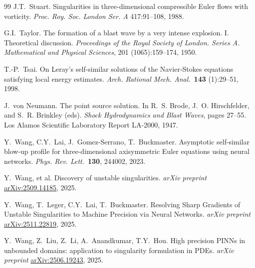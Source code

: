 \documentclass[11pt,reqno]{amsproc}
\numberwithin{equation}{section}
\theoremstyle{remark}
\begin{document}
\begin{thebibliography}{99}
J.T.~Stuart. 
\newblock Singularities in three-dimensional compressible Euler flows with vorticity.
\newblock \textit{Proc. Roy. Soc. London Ser. A} 417:91--108, 1988.

G.I.~Taylor.
\newblock The formation of a blast wave by a very intense explosion. {I}. {T}heoretical discussion.
\newblock \textit{Proceedings of the Royal Society of London. Series A.
  Mathematical and Physical Sciences}, 201 (1065):159--174, 1950.
  
T.-P.~Tsai.
\newblock On Leray's self‐similar solutions of the Navier‐Stokes equations satisfying local energy estimates.
\newblock \textit{Arch. Rational Mech. Anal.}~\textbf{143} (1):29--51, 1998.  

J.~von Neumann.
\newblock The point source solution.
\newblock In R.~S. Brode, J.~O. Hirschfelder, and S.~R. Brinkley (eds). 
\textit{Shock Hydrodynamics and Blast Waves}, pages 27--55. Los Alamos 
  Scientific Laboratory Report LA-2000, 1947.
  
Y.~Wang, C.Y.~Lai, J.~Gomez-Serrano, T.~Buckmaster. 
\newblock Asymptotic self-similar blow-up profile for three-dimensional axisymmetric Euler equations using neural networks. 
\newblock \textit{Phys. Rev. Lett.}~\textbf{130}, 244002, 2023.

Y.~Wang, et al.
\newblock Discovery of unstable singularities.
\newblock \textit{arXiv preprint} \href{https://arxiv.org/abs/2509.14185}{arXiv:2509.14185}, 2025.

Y.~Wang, T.~Leger, C.Y.~Lai, T.~Buckmaster. 
\newblock Resolving Sharp Gradients of Unstable Singularities to Machine Precision via Neural Networks. 
\newblock \textit{arXiv preprint} \href{https://arxiv.org/abs/2511.22819}{arXiv:2511.22819}, 2025.

Y.~Wang, Z.~Liu, Z.~Li, A.~Anandkumar, T.Y.~Hou. 
\newblock High precision PINNs in unbounded domains:
application to singularity formulation in PDEs. 
\newblock \textit{arXiv preprint} \href{https://arxiv.org/abs/2506.19243}{arXiv:2506.19243}, 2025.


\end{thebibliography}
\end{document}
